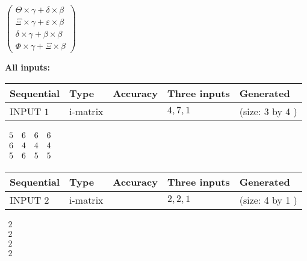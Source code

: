 \documentclass[12pt]{article}
\begin{document}
   
 $  \left( \begin{array}
 {
 c
 }
  \Theta \times  \gamma +  \delta \times  \beta \\ 
                     \Xi \times  \gamma +  \varepsilon \times  \beta \\ 
  \delta \times  \gamma +  \beta \times  \beta \\ 
  \Phi \times  \gamma +                     \Xi \times  \beta
 \end{array} \right) $ 
   
   
\noindent\vspace{0.1in}\hspace{-0.08in} {\textbf{\Large{All inputs: }}}
   
   
  
  
\noindent\begin{tabular}{|l|l|l|l|l|}
\hline
 Sequential & Type & Accuracy & Three inputs & Generated \\ 
\hline
 
 
  INPUT $            1 $ & i-matrix &  & $
 4
 , 
 7
 , 
 1
 $ & (size:            3  by            4 )
 \\  \hline  
 \end{tabular}
   
   
 $\begin{array}{
 c
 c
 c
 c
 }
           5  & 
           6  & 
           6  & 
           6  \\ 
           6  & 
           4  & 
           4  & 
           4  \\ 
           5  & 
           6  & 
           5  & 
           5
\end{array}  $ 
  
  
\noindent\begin{tabular}{|l|l|l|l|l|}
\hline
 Sequential & Type & Accuracy & Three inputs & Generated \\ 
\hline
 
 
  INPUT $            2 $ & i-matrix &  & $
 2
 , 
 2
 , 
 1
 $ & (size:            4  by            1 )
 \\  \hline  
 \end{tabular}
   
   
 $\begin{array}{
 c
 }
           2  \\ 
           2  \\ 
           2  \\ 
           2
\end{array}  $ 
  
\end{document}
